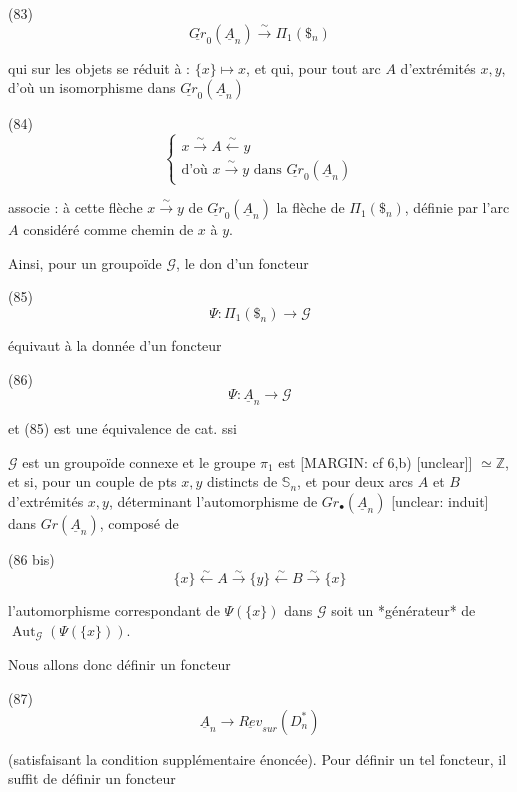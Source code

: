 (83) $$\underline{Gr}_0(\underline{A}_n) \overset{\sim}{\longrightarrow} \Pi_1(\$_n)$$

qui sur les objets se réduit à : 
$\{x\} \mapsto x$, et qui, pour tout arc $A$ d'extrémités $x,y$, d'où un isomorphisme dans $\underline{Gr}_0(\underline{A}_n)$

(84) $$ \left\{ \begin{matrix} x \overset{\sim}{\longrightarrow} A \overset{\sim}{\longleftarrow} y \\ \text{d'où } x \overset{\sim}{\longrightarrow} y \text{ dans } \underline{Gr}_0(\underline{A}_n) \end{matrix} \right. $$

associe : à cette flèche $x \overset{\sim}{\longrightarrow} y$ de $\underline{Gr}_0(\underline{A}_n)$ la flèche de $\Pi_1(\$_n)$, définie par l'arc $A$ considéré comme chemin de $x$ à $y$.

Ainsi, pour un groupoïde $\mathcal{G}$, le don d'un foncteur

(85) $$\Psi : \Pi_1(\$_n) \longrightarrow \mathcal{G}$$

équivaut à la donnée d'un foncteur

\newpage


(86) $$ \Psi : \underline{A}_n \longrightarrow \mathcal{G} $$

et (85) est une équivalence de cat. ssi

$\mathcal{G}$ est un groupoïde connexe et le groupe $\pi_1$ est [MARGIN: cf 6,b) [unclear]]
$\simeq \mathbb{Z}$, et si, pour un couple de
pts $x, y$ distincts de $\mathbb{S}_n$, et pour
deux arcs $A$ et $B$ d'extrémités $x, y$,
déterminant l'automorphisme de
$Gr_{\bullet}(\underline{A}_n)$ [unclear: induit] dans $Gr(\underline{A}_n)$, composé de

(86 bis) $$ \{x\} \overset{\sim}{\longleftarrow} A \overset{\sim}{\longrightarrow} \{y\} \overset{\sim}{\longleftarrow} B \overset{\sim}{\longrightarrow} \{x\} $$

l'automorphisme correspondant de $\Psi(\{x\})$ dans $\mathcal{G}$
soit un *générateur* de $\operatorname{Aut}_{\mathcal{G}}(\Psi(\{x\}))$.

Nous allons donc définir un
foncteur

(87) $$ \underline{A}_n \longrightarrow \underline{Rev}_{sur} (D_n^*) $$

(satisfaisant la condition supplémentaire
énoncée). Pour définir un tel foncteur,
il suffit de définir un foncteur

